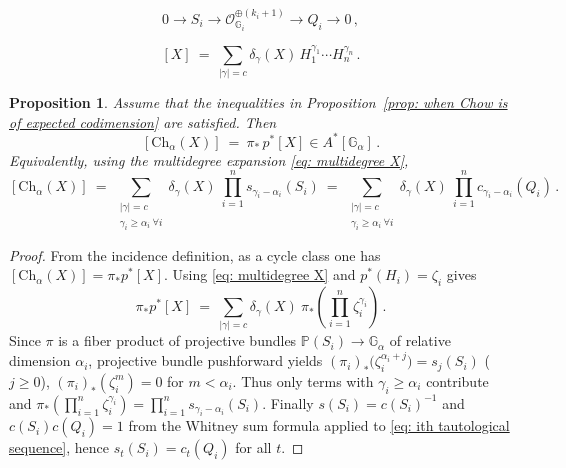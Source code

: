 \documentclass[10pt,a4paper]{amsart}
\newtheorem{proposition}{Proposition}
\newcommand{\G}{{\mathbb G}}
\newcommand{\PP}{{\mathbb P}}
\newcommand{\ko}{{\mathcal O}}
\begin{document}
\begin{equation}\label{eq: ith tautological sequence}
    0\to S_i \to \ko_{\G_i}^{\oplus (k_i+1)} \to Q_i \to 0\,,
\end{equation}

\begin{equation}\label{eq: multidegree X}
    [X]\ =\ \sum_{|\gamma|=c} \delta_\gamma(X)\, H_1^{\gamma_1}\cdots H_n^{\gamma_n}\,.
\end{equation}

\begin{proposition}\label{prop: class of multigraded associated variety}
Assume that the inequalities in Proposition~\ref{prop: when Chow is of expected codimension} are satisfied. Then
\[
    [\mathrm{Ch}_\alpha(X)] \ =\  \pi_*\,p^*[X]\in A^*[\G_\alpha]\,.
\]
Equivalently, using the multidegree expansion \eqref{eq: multidegree X},
\begin{equation}\label{eq: deg multigraded associated variety}
    [\mathrm{Ch}_\alpha(X)]\ =\ \sum_{\substack{|\gamma|=c\\\gamma_i\ge\alpha_i\ \forall i}} \delta_\gamma(X)\ \prod_{i=1}^n s_{\gamma_i-\alpha_i}(S_i)\ =\ \sum_{\substack{|\gamma|=c\\\gamma_i\ge \alpha_i\ \forall i}}\delta_\gamma(X)\ \prod_{i=1}^n c_{\gamma_i-\alpha_i}(Q_i)\,.
\end{equation}
\end{proposition}

\begin{proof}
From the incidence definition, as a cycle class one has $[\mathrm{Ch}_\alpha(X)]=\pi_*p^*[X]$.
Using \eqref{eq: multidegree X} and $p^*(H_i)=\zeta_i$ gives
\[
    \pi_*p^*[X]\ =\ \sum_{|\gamma|=c}\delta_\gamma(X)\ \pi_*\!\left(\prod_{i=1}^n \zeta_i^{\gamma_i}\right)\,.
\]
Since $\pi$ is a fiber product of projective bundles $\PP(S_i)\to \G_\alpha$ of relative dimension $\alpha_i$, projective bundle pushforward yields $(\pi_i)_*\bigl(\zeta_i^{\alpha_i+j}\bigr)=s_j(S_i)$ ($j\ge 0$), $(\pi_i)_*(\zeta_i^m)=0$ for $m<\alpha_i$.
Thus only terms with $\gamma_i\ge \alpha_i$ contribute and $\pi_*\!\left(\prod_{i=1}^n \zeta_i^{\gamma_i}\right) = \prod_{i=1}^n s_{\gamma_i-\alpha_i}(S_i)$.
Finally $s(S_i)=c(S_i)^{-1}$ and $c(S_i)c(Q_i)=1$ from the Whitney sum formula applied to \eqref{eq: ith tautological sequence}, hence $s_{t}(S_i)=c_t(Q_i)$ for all $t$.
\end{proof}
\end{document}
